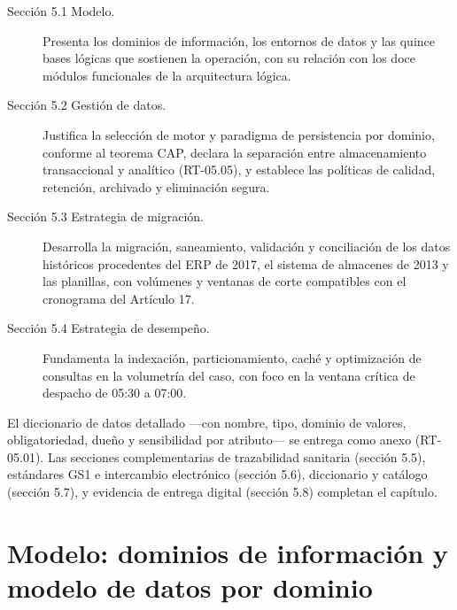 \begin{description}
\item[Sección 5.1 Modelo.] Presenta los dominios de información, los entornos de
  datos y las quince bases lógicas que sostienen la operación, con su relación
  con los doce módulos funcionales de la arquitectura lógica.

\item[Sección 5.2 Gestión de datos.] Justifica la selección de motor y paradigma de
  persistencia por dominio, conforme al teorema CAP, declara la separación
  entre almacenamiento transaccional y analítico (RT-05.05), y establece las
  políticas de calidad, retención, archivado y eliminación segura.

\item[Sección 5.3 Estrategia de migración.] Desarrolla la migración, saneamiento,
  validación y conciliación de los datos históricos procedentes del ERP de 2017,
  el sistema de almacenes de 2013 y las planillas, con volúmenes y ventanas de
  corte compatibles con el cronograma del Artículo 17.

\item[Sección 5.4 Estrategia de desempeño.] Fundamenta la indexación,
  particionamiento, caché y optimización de consultas en la volumetría del
  caso, con foco en la ventana crítica de despacho de 05:30 a 07:00.
\end{description}

El diccionario de datos detallado ---con nombre, tipo, dominio de valores,
obligatoriedad, dueño y sensibilidad por atributo--- se entrega como anexo
(RT-05.01).  Las secciones complementarias de trazabilidad sanitaria
(sección 5.5), estándares GS1 e intercambio electrónico (sección 5.6), diccionario y
catálogo (sección 5.7), y evidencia de entrega digital (sección 5.8) completan el
capítulo.



\section{Modelo: dominios de información y modelo de datos por dominio}
\label{sec:modelo-dominios}

